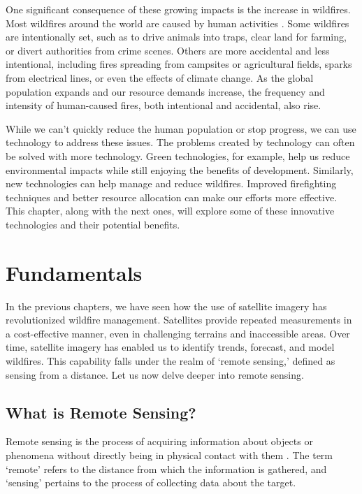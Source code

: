 \documentclass[
  12 pt,
]{Nemilov}
\begin{document}
One significant consequence of these growing impacts is the increase in wildfires. Most wildfires around the world are caused by human activities \citep{robinne2021impacts}. Some wildfires are intentionally set, such as to drive animals into traps, clear land for farming, or divert authorities from crime scenes. Others are more accidental and less intentional, including fires spreading from campsites or agricultural fields, sparks from electrical lines, or even the effects of climate change. As the global population expands and our resource demands increase, the frequency and intensity of human-caused fires, both intentional and accidental, also rise.

While we can't quickly reduce the human population or stop progress, we can use technology to address these issues. The problems created by technology can often be solved with more technology. Green technologies, for example, help us reduce environmental impacts while still enjoying the benefits of development. Similarly, new technologies can help manage and reduce wildfires. Improved firefighting techniques and better resource allocation can make our efforts more effective. This chapter, along with the next ones, will explore some of these innovative technologies and their potential benefits.

\section{Fundamentals}\label{fundamentals}

In the previous chapters, we have seen how the use of satellite imagery has revolutionized wildfire management. Satellites provide repeated measurements in a cost-effective manner, even in challenging terrains and inaccessible areas. Over time, satellite imagery has enabled us to identify trends, forecast, and model wildfires. This capability falls under the realm of `remote sensing,' defined as sensing from a distance. Let us now delve deeper into remote sensing.

\subsection{What is Remote Sensing?}\label{what-is-remote-sensing}

Remote sensing is the process of acquiring information about objects or phenomena without directly being in physical contact with them \citep{ankur-rs}. The term `remote' refers to the distance from which the information is gathered, and `sensing' pertains to the process of collecting data about the target.
\end{document}
